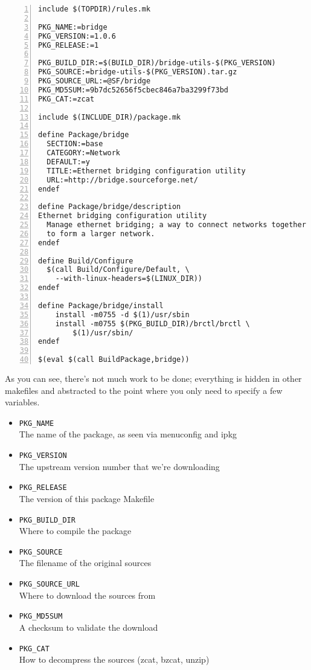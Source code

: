 \begin{Verbatim}[frame=single,numbers=left]
include $(TOPDIR)/rules.mk

PKG_NAME:=bridge
PKG_VERSION:=1.0.6
PKG_RELEASE:=1

PKG_BUILD_DIR:=$(BUILD_DIR)/bridge-utils-$(PKG_VERSION)
PKG_SOURCE:=bridge-utils-$(PKG_VERSION).tar.gz
PKG_SOURCE_URL:=@SF/bridge
PKG_MD5SUM:=9b7dc52656f5cbec846a7ba3299f73bd
PKG_CAT:=zcat

include $(INCLUDE_DIR)/package.mk

define Package/bridge
  SECTION:=base
  CATEGORY:=Network
  DEFAULT:=y
  TITLE:=Ethernet bridging configuration utility
  URL:=http://bridge.sourceforge.net/
endef

define Package/bridge/description
Ethernet bridging configuration utility
  Manage ethernet bridging; a way to connect networks together
  to form a larger network.
endef

define Build/Configure
  $(call Build/Configure/Default, \
    --with-linux-headers=$(LINUX_DIR))
endef

define Package/bridge/install
    install -m0755 -d $(1)/usr/sbin
    install -m0755 $(PKG_BUILD_DIR)/brctl/brctl \
        $(1)/usr/sbin/
endef

$(eval $(call BuildPackage,bridge))
\end{Verbatim}


As you can see, there's not much work to be done; everything is hidden in other makefiles
and abstracted to the point where you only need to specify a few variables.

\begin{itemize}
    \item \texttt{PKG\_NAME} \\
        The name of the package, as seen via menuconfig and ipkg
    \item \texttt{PKG\_VERSION} \\
        The upstream version number that we're downloading
    \item \texttt{PKG\_RELEASE} \\
        The version of this package Makefile
    \item \texttt{PKG\_BUILD\_DIR} \\
        Where to compile the package
    \item \texttt{PKG\_SOURCE} \\
        The filename of the original sources
    \item \texttt{PKG\_SOURCE\_URL} \\
        Where to download the sources from
    \item \texttt{PKG\_MD5SUM} \\
        A checksum to validate the download
    \item \texttt{PKG\_CAT} \\
        How to decompress the sources (zcat, bzcat, unzip)
\end{itemize}

